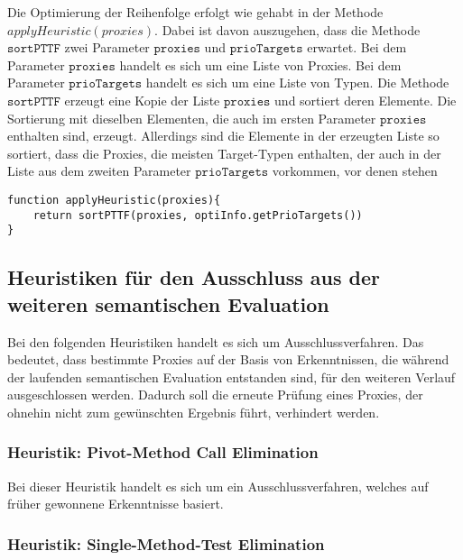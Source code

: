 \documentclass[a4paper,12pt]{article}
\begin{document}
\noindent
Die Optimierung der Reihenfolge erfolgt wie gehabt in der Methode $\mathit{applyHeuristic(proxies)}$. Dabei ist davon auszugehen, dass die Methode $\texttt{sortPTTF}$ zwei Parameter $\texttt{proxies}$ und $\texttt{prioTargets}$ erwartet. Bei dem Parameter $\texttt{proxies}$ handelt es sich um eine Liste von Proxies. Bei dem Parameter $\texttt{prioTargets}$ handelt es sich um eine Liste von Typen. Die Methode $\texttt{sortPTTF}$ erzeugt eine Kopie der Liste $\texttt{proxies}$ und sortiert deren Elemente. Die Sortierung mit dieselben Elementen, die auch im ersten Parameter $\texttt{proxies}$ enthalten sind, erzeugt. Allerdings sind die Elemente in der erzeugten Liste so sortiert, dass die Proxies, die meisten Target-Typen enthalten, der auch in der Liste aus dem zweiten Parameter $\texttt{prioTargets}$ vorkommen, vor denen stehen
\begin{lstlisting}[style = pseudo,caption = Auswertung des Testergebnisses, captionpos = b]
function applyHeuristic(proxies){
	return sortPTTF(proxies, optiInfo.getPrioTargets())
}
\end{lstlisting}\label{lst_applyHeuristicPTTF}

\subsection{Heuristiken für den Ausschluss aus der weiteren semantischen Evaluation}
Bei den folgenden Heuristiken handelt es sich um Ausschlussverfahren. Das bedeutet, dass bestimmte Proxies auf der Basis von Erkenntnissen, die während der laufenden semantischen Evaluation entstanden sind, für den weiteren Verlauf ausgeschlossen werden. Dadurch soll die erneute Prüfung eines Proxies, der ohnehin nicht zum gewünschten Ergebnis führt, verhindert werden.
\subsubsection{Heuristik: Pivot-Method Call Elimination}
Bei dieser Heuristik handelt es sich um ein Ausschlussverfahren, welches auf früher gewonnene Erkenntnisse basiert.
\subsubsection{Heuristik: Single-Method-Test Elimination}
\end{document}
